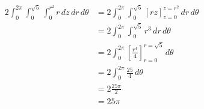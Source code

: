 \documentclass{article}
\newcommand{\reals}{\mathbb{R}}
\begin{document}
\begin{align*}
    2\int_{0}^{2\pi} \int_{0}^{\sqrt{5}} 
        \int_{0}^{r^2} r \,dz \,dr \,d\theta 
    &= 2\int_{0}^{2\pi} \int_{0}^{\sqrt{5}} 
        \left[ rz \right]_{z=0}^{z=r^2} \,dr \,d\theta \\
    &= 2\int_{0}^{2\pi} \int_{0}^{\sqrt{5}} r^3 \,dr \,d\theta \\
    &= 2\int_{0}^{2\pi} 
        \left[\frac{r^4}{4}\right]_{r=0}^{r={\sqrt{5}}} \,d\theta \\
    &= 2\int_{0}^{2\pi} \frac{25}{4}\,d\theta \\
    &= 2\frac{25\pi}{2} \\
    &= 25\pi
\end{align*}


\end{document}
